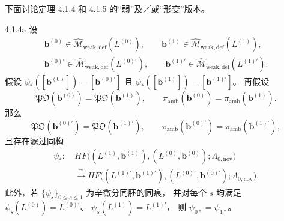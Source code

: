 下面讨论定理 4.1.4 和 4.1.5
的“弱”及／或“形变”版本。

\begin{theorem}{4.1.4a}\label{thm:4-1-4a}
设
\[
\begin{gathered}
\boldsymbol b^{(0)}
\in\widehat{\mathcal M}_{\mathrm{weak,def}}(L^{(0)}),
\qquad
\boldsymbol b^{(1)}
\in\widehat{\mathcal M}_{\mathrm{weak,def}}(L^{(1)}),\\
\boldsymbol b^{(0)\prime}
\in\widehat{\mathcal M}_{\mathrm{weak,def}}(L^{(0)\prime}),
\qquad
\boldsymbol b^{(1)\prime}
\in\widehat{\mathcal M}_{\mathrm{weak,def}}(L^{(1)\prime}).
\end{gathered}
\]
假设
$\psi_*([\boldsymbol b^{(0)}])
=[\boldsymbol b^{(0)\prime}]$
且
$\psi_*([\boldsymbol b^{(1)}])
=[\boldsymbol b^{(1)\prime}]$。
再假设
\[
\mathfrak{PO}(\boldsymbol b^{(0)})
=\mathfrak{PO}(\boldsymbol b^{(1)}),
\qquad
\pi_{\mathrm{amb}}(\boldsymbol b^{(0)})
=\pi_{\mathrm{amb}}(\boldsymbol b^{(1)}).
\]
那么
\begin{equation}
\mathfrak{PO}(\boldsymbol b^{(0)\prime})
=\mathfrak{PO}(\boldsymbol b^{(1)\prime}),
\qquad
\pi_{\mathrm{amb}}(\boldsymbol b^{(0)\prime})
=\pi_{\mathrm{amb}}(\boldsymbol b^{(1)\prime}),
\tag{5.3.77}\label{eq:5-3-77}
\end{equation}
且存在滤过同构
\[
\begin{aligned}
\psi_*\colon\
&HF\bigl(
(L^{(1)},\boldsymbol b^{(1)}),
(L^{(0)},\boldsymbol b^{(0)});
\Lambda_{0,\mathrm{nov}}
\bigr)\\
&\xrightarrow{\ \cong\ }
HF\bigl(
(L^{(1)\prime},\boldsymbol b^{(1)\prime}),
(L^{(0)\prime},\boldsymbol b^{(0)\prime});
\Lambda_{0,\mathrm{nov}}
\bigr).
\end{aligned}
\]
此外，若
$\{\psi_s\}_{0\le s\le1}$
为辛微分同胚的同痕，
并对每个 $s$ 均满足
$\psi_s(L^{(0)})=L^{(0)\prime}$、
$\psi_s(L^{(1)})=L^{(1)\prime}$，
则 $\psi_{0*}=\psi_{1*}$。
\end{theorem}

